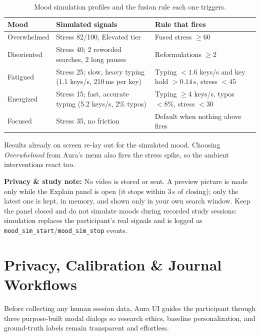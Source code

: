 \documentclass[11pt,a4paper]{article}
\newcommand{\notebox}[2]{%
  \vspace{0.2cm}\noindent
  \colorbox{CalloutBg}{%
    \parbox{\dimexpr\textwidth-2\fboxsep\relax}{%
      \small \textbf{\color{AuraTeal}#1:} #2%
    }%
  }\vspace{0.25cm}%
}
\begin{document}
\begin{table}[htbp]
\centering
\small
\begin{tabularx}{\textwidth}{>{\raggedright\arraybackslash}p{2.4cm} >{\raggedright\arraybackslash}X >{\raggedright\arraybackslash}X}
\toprule
\textbf{Mood} & \textbf{Simulated signals} & \textbf{Rule that fires} \\
\midrule
Overwhelmed & Stress 82/100, Elevated tier & Fused stress $\ge 60$ \\
Disoriented & Stress 40; 2 reworded searches, 2 long pauses & Reformulations $\ge 2$ \\
Fatigued & Stress 25; slow, heavy typing (1.1 keys/s, 210\,ms per key) & Typing $<1.6$ keys/s and key hold $>0.14$\,s, stress $<45$ \\
Energized & Stress 15; fast, accurate typing (5.2 keys/s, 2\% typos) & Typing $\ge 4$ keys/s, typos $<8\%$, stress $<30$ \\
Focused & Stress 35, no friction & Default when nothing above fires \\
\bottomrule
\end{tabularx}
\caption{Mood simulation profiles and the fusion rule each one triggers.}
\label{tab:moodsim}
\end{table}

Results already on screen re-lay out for the simulated mood. Choosing \textit{Overwhelmed} from Aura's menu also fires the stress spike, so the ambient interventions react too.

\notebox{Privacy \& study note}{No video is stored or sent. A preview picture is made only while the Explain panel is open (it stops within 3\,s of closing); only the latest one is kept, in memory, and shown only in your own search window. Keep the panel closed and do not simulate moods during recorded study sessions: simulation replaces the participant's real signals and is logged as \texttt{mood\_sim\_start}/\texttt{mood\_sim\_stop} events.}

\section{Privacy, Calibration \& Journal Workflows}

Before collecting any human session data, Aura UI guides the participant through three purpose-built modal dialogs so research ethics, baseline personalization, and ground-truth labels remain transparent and effortless.
\end{document}
